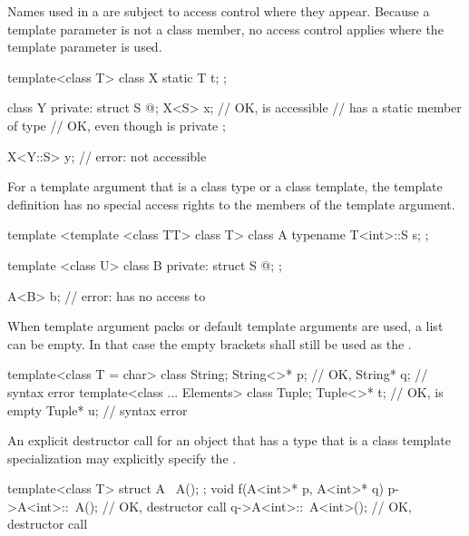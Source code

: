 \pnum
\begin{note}
Names used in a 
are subject to access control where they appear.
Because a template parameter is not a class member,
no access control applies where the template parameter is used.
\end{note}
\begin{example}
\begin{codeblock}
template<class T> class X {
  static T t;
};

class Y {
private:
  struct S { @\commentellip@ };
  X<S> x;           // OK,  is accessible
                    //  has a static member of type 
                    // OK, even though  is private
};

X<Y::S> y;          // error:  not accessible
\end{codeblock}
\end{example}
For a template argument that is a class type or a class template,
the template definition has no special access rights
to the members of the template argument.
\begin{example}
\begin{codeblock}
template <template <class TT> class T> class A {
  typename T<int>::S s;
};

template <class U> class B {
private:
  struct S { @\commentellip@ };
};

A<B> b;             // error:  has no access to 
\end{codeblock}
\end{example}

\pnum
When template argument packs or default template arguments are used,
a  list can be empty.
In that case the empty
\tcode{<>}
brackets shall still be used as the
.
\begin{example}
\begin{codeblock}
template<class T = char> class String;
String<>* p;                    // OK, 
String* q;                      // syntax error
template<class ... Elements> class Tuple;
Tuple<>* t;                     // OK,  is empty
Tuple* u;                       // syntax error
\end{codeblock}
\end{example}

\pnum
An explicit destructor call for an object that has a type
that is a class template specialization may explicitly specify the
.
\begin{example}
\begin{codeblock}
template<class T> struct A {
  ~A();
};
void f(A<int>* p, A<int>* q) {
  p->A<int>::~A();              // OK, destructor call
  q->A<int>::~A<int>();         // OK, destructor call
}
\end{codeblock}
\end{example}


